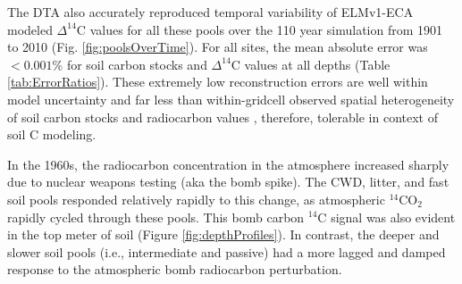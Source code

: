 \documentclass[11pt,a4paper]{article}
\begin{document}
 The DTA also accurately reproduced temporal variability of ELMv1-ECA modeled $\Delta^{14}$C values for all these pools over the 110 year simulation from 1901 to 2010 (Fig. \ref{fig:poolsOverTime}). For all sites, the mean absolute error was $<0.001$\% for soil carbon stocks and $\Delta^{14}$C values at all depths (Table \ref{tab:ErrorRatios}). These extremely low reconstruction errors are well within model uncertainty and far less than within-gridcell observed spatial heterogeneity of soil carbon stocks and radiocarbon values \citep{Chen2009JGR}, therefore, tolerable in context of soil C modeling.

In the 1960s, the radiocarbon concentration in the atmosphere increased sharply due to nuclear weapons testing (aka the bomb spike). The CWD, litter, and fast soil pools responded relatively rapidly to this change, as atmospheric $^{14}$CO$_2$ rapidly cycled through these pools. This bomb carbon $^{14}$C signal was also evident in the top meter of soil (Figure \ref{fig:depthProfiles}). In contrast, the deeper and slower soil pools (i.e., intermediate and passive) had a more lagged and damped response to the atmospheric bomb radiocarbon perturbation.
\end{document}
